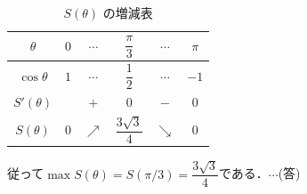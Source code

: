 \documentclass[../../main.tex]{subfiles}
\begin{document}
\begin{table}[htb]
  \centering
  \caption{$S(\theta)$ の増減表}
  \label{tab:s_theta_increments}
  \begin{tabular}{|c|c|c|c|c|c|}
    \hline
    $\theta$ & $0$ & $\cdots$ & $\dfrac{\pi}{3}$ & $\cdots$ & $\pi$ \\ \hline
    $\cos\theta$ & $1$ & $\cdots$ & $\dfrac{1}{2}$ & $\cdots$ & $-1$ \\ \hline
    $S'(\theta)$ & & $+$ & $0$ & $-$ & $0$ \\ \hline
    $S(\theta)$ & $0$ & $\nearrow$ & $\dfrac{3\sqrt{3}}{4}$ & $\searrow$ & $0$ \\ \hline
  \end{tabular}
\end{table}
従って$\max S(\theta)=S(\pi/3)=\dfrac{3\sqrt{3}}{4}$である．$\cdots$(答)
\newpage
\end{document}
